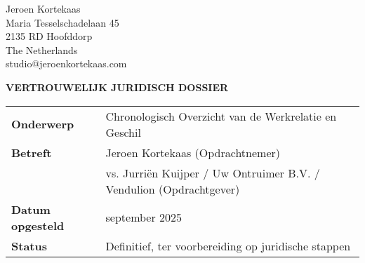 \documentclass[10pt,a4paper]{article}
\begin{document}
\fontsize{9}{15}\selectfont

\noindent
\hfill
\begin{minipage}[t]{0.5\textwidth}
\raggedleft
{\fontsize{11}{16}\selectfont Jeroen Kortekaas} \\
Maria Tesselschadelaan 45 \\
2135 RD Hoofddorp \\
The Netherlands \\
studio@jeroenkortekaas.com \\
\end{minipage}

\vspace{1.5em}

\begin{adjustwidth}{15mm}{15mm}

{\fontsize{13}{18}\selectfont\textbf{VERTROUWELIJK JURIDISCH DOSSIER}}

\vspace{1em}

\end{adjustwidth}

\begin{longtable}{>{\raggedright}p{3cm}>{\raggedright\arraybackslash}p{13.5cm}}
\textbf{Onderwerp} & Chronologisch Overzicht van de Werkrelatie en Geschil \\[0.8em]
\textbf{Betreft} & Jeroen Kortekaas (Opdrachtnemer) \\
& vs. Jurriën Kuijper / Uw Ontruimer B.V. / Vendulion (Opdrachtgever) \\[0.8em]
\textbf{Datum opgesteld} & 15 september 2025 \\[0.8em]
\textbf{Status} & Definitief, ter voorbereiding op juridische stappen \\
\end{longtable}
\end{document}
